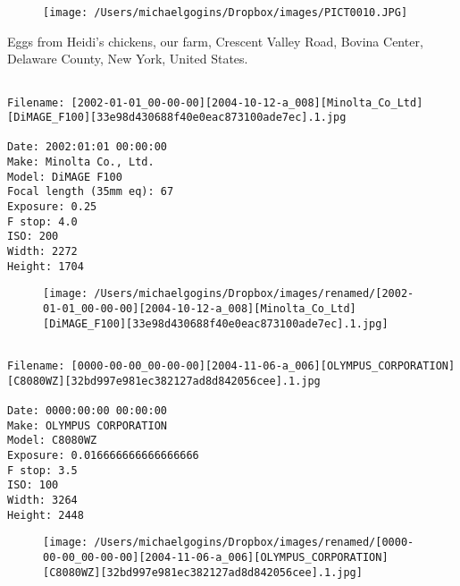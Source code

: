 \begin{figure}
\texttt{[image: /Users/michaelgogins/Dropbox/images/PICT0010.JPG]}
\end{figure}
    
\clearpage
\onecolumn
\noindent Eggs from Heidi's chickens, our farm, Crescent Valley Road, Bovina Center, Delaware County, New York, United States.
\noindent
\begin{lstlisting}

Filename: [2002-01-01_00-00-00][2004-10-12-a_008][Minolta_Co_Ltd][DiMAGE_F100][33e98d430688f40e0eac873100ade7ec].1.jpg

Date: 2002:01:01 00:00:00
Make: Minolta Co., Ltd.
Model: DiMAGE F100
Focal length (35mm eq): 67
Exposure: 0.25
F stop: 4.0
ISO: 200
Width: 2272
Height: 1704
\end{lstlisting}
\clearpage

\begin{figure}
\texttt{[image: /Users/michaelgogins/Dropbox/images/renamed/[2002-01-01\_00-00-00][2004-10-12-a\_008][Minolta\_Co\_Ltd][DiMAGE\_F100][33e98d430688f40e0eac873100ade7ec].1.jpg]}
\end{figure}
    
\clearpage
\onecolumn
\noindent 
\noindent
\begin{lstlisting}

Filename: [0000-00-00_00-00-00][2004-11-06-a_006][OLYMPUS_CORPORATION][C8080WZ][32bd997e981ec382127ad8d842056cee].1.jpg

Date: 0000:00:00 00:00:00
Make: OLYMPUS CORPORATION
Model: C8080WZ
Exposure: 0.016666666666666666
F stop: 3.5
ISO: 100
Width: 3264
Height: 2448
\end{lstlisting}
\clearpage

\begin{figure}
\texttt{[image: /Users/michaelgogins/Dropbox/images/renamed/[0000-00-00\_00-00-00][2004-11-06-a\_006][OLYMPUS\_CORPORATION][C8080WZ][32bd997e981ec382127ad8d842056cee].1.jpg]}
\end{figure}
    
